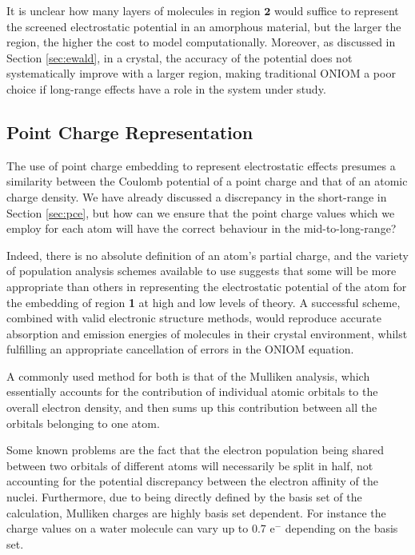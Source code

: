 It is unclear how many layers of molecules in region $\bm{2}$ would suffice to represent the screened electrostatic potential in an amorphous material, but the larger the region, the higher the cost to model computationally. Moreover, as discussed in Section \ref{sec:ewald}, in a crystal, the accuracy of the potential does not systematically improve with a larger region, making traditional ONIOM a poor choice if long-range effects have a role in the system under study.

\subsection{Point Charge Representation}
\label{sec:prob_char}
The use of point charge embedding to represent electrostatic effects presumes a similarity between the Coulomb potential of a point charge and that of an atomic charge density. We have already discussed a discrepancy in the short-range in Section \ref{sec:pce}, but how can we ensure that the point charge values which we employ for each atom will have the correct behaviour in the mid-to-long-range?

Indeed, there is no absolute definition of an atom's partial charge, and the variety of population analysis schemes available to use suggests that some will be more appropriate than others in representing the electrostatic potential of the atom for the embedding of region \textbf{1} at high and low levels of theory. A successful scheme, combined with valid electronic structure methods, would reproduce accurate absorption and emission energies of molecules in their crystal environment, whilst fulfilling an appropriate cancellation of errors in the ONIOM equation.

A commonly used method for both is that of the Mulliken analysis,\cite{Hratchian2008} which essentially accounts for the contribution of individual atomic orbitals to the overall electron density, and then sums up this contribution between all the orbitals belonging to one atom.\cite{Mulliken1955}

Some known problems are the fact that the electron population being shared between two orbitals of different atoms will necessarily be split in half, not accounting for the potential discrepancy between the electron affinity of the nuclei. Furthermore, due to being directly defined by the basis set of the calculation, Mulliken charges are highly basis set dependent. For instance the charge values on a water molecule can vary up to 0.7 $\mathrm{e^-}$ depending on the basis set.\cite{Martin2005}

